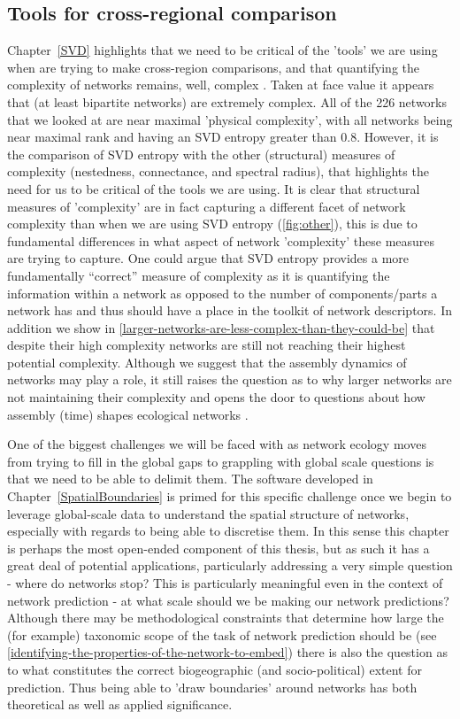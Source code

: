 \subsection{Tools for cross-regional comparison}

Chapter~\ref{SVD} highlights that we need to be critical of the 'tools' we are using when are trying to make cross-region comparisons, and that quantifying the complexity of networks remains, well, complex \cite{Riva2023Cohesive}. Taken at face value it appears that (at least bipartite networks) are extremely complex. All of the 226 networks that we looked at are near maximal 'physical complexity', with all networks being near maximal rank and having an SVD entropy greater than 0.8. However, it is the comparison of SVD entropy with the other (structural) measures of complexity (nestedness, connectance, and spectral radius), that highlights the need for us to be critical of the tools we are using. It is clear that structural measures of 'complexity' are in fact capturing a different facet of network complexity than when we are using SVD entropy (\autoref{fig:other}), this is due to fundamental differences in what aspect of network 'complexity' these measures are trying to capture. One could argue that SVD entropy provides a more fundamentally “correct” measure of complexity as it is quantifying the information within a network as opposed to the number of components/parts a network has and thus should have a place in the toolkit of network descriptors. In addition we show in \autoref{larger-networks-are-less-complex-than-they-could-be} that despite their high complexity networks are still not reaching their highest potential complexity. Although we suggest that the assembly dynamics of networks may play a role, it still raises the question as to why larger networks are not maintaining their complexity and opens the door to questions about how assembly (time) shapes ecological networks \cite{Barbier2018GenAss, Saravia2018EcoNet}.

One of the biggest challenges we will be faced with as network ecology moves from trying to fill in the global gaps to grappling with global scale questions is that we need to be able to delimit them. The software developed in Chapter~\ref{SpatialBoundaries} is primed for this specific challenge once we begin to leverage global-scale data to understand the spatial structure of networks, especially with regards to being able to discretise them. In this sense this chapter is perhaps the most open-ended component of this thesis, but as such it has a great deal of potential applications, particularly addressing a very simple question - where do networks stop? This is particularly meaningful even in the context of network prediction - at what scale should we be making our network predictions? Although there may be methodological constraints that determine how large the (for example) taxonomic scope of the task of network prediction should be (see \autoref{identifying-the-properties-of-the-network-to-embed}) there is also the question as to what constitutes the correct biogeographic (and socio-political) extent for prediction. Thus being able to 'draw boundaries' around networks has both theoretical as well as applied significance. 

